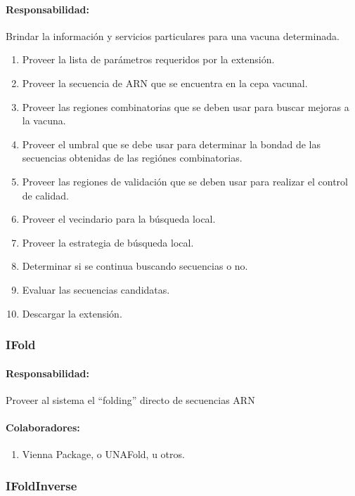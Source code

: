     \paragraph{Responsabilidad:} Brindar la informaci\'on y servicios
particulares para una vacuna determinada.    
      \begin{enumerate}
       \item Proveer la lista de par\'ametros requeridos por la extensi\'on.
       \item Proveer la secuencia de ARN que se encuentra en la cepa vacunal.
       \item Proveer las regiones combinatorias que se deben usar para buscar
mejoras a la vacuna.
       \item Proveer el umbral que se debe usar para determinar la bondad de las
secuencias obtenidas de las regi\'ones combinatorias.
       \item Proveer las regiones de validaci\'on que se deben usar para
realizar el control de calidad.       
       \item Proveer el vecindario para la b\'usqueda local.
       \item Proveer la estrategia de b\'usqueda local.
       \item Determinar si se continua buscando secuencias o no.
       \item Evaluar las secuencias candidatas.
       \item Descargar la extensi\'on.
      \end{enumerate}

  \subsubsection{IFold}
    \paragraph{Responsabilidad:} Proveer al sistema el ``folding'' directo de
secuencias ARN
    \paragraph{Colaboradores:}
      \begin{enumerate}
       \item Vienna Package, o UNAFold, u otros.
      \end{enumerate}

  \subsubsection{IFoldInverse}
